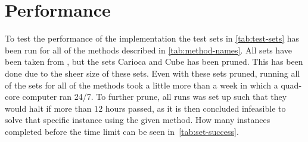 \section{Performance}
\label{sec:performance}

To test the performance of the implementation the test sets in
\cref{tab:test-sets} has been run for all of the methods described in
\cref{tab:method-names}. All sets have been taken from \textcite{fonseca2014},
but the sets Carioca and Cube has been pruned. This has been done due to the
sheer size of these sets. Even with these sets pruned, running all of the sets
for all of the methods took a little more than a week in which a quad-core
computer ran 24/7. To further prune, all runs was set up such that they would
halt if more than $12$ hours passed, as it is then concluded infeasible to solve
that specific instance using the given method. How many instances completed
before the time limit can be seen in~\cref{tab:set-success}.

